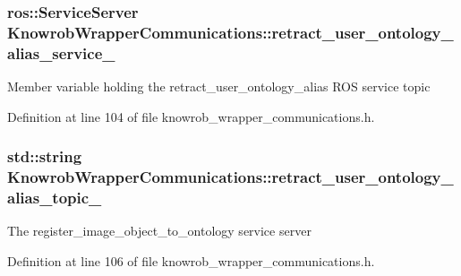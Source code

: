 \hypertarget{classKnowrobWrapperCommunications_a281262d96049a59096a5a29fbaac77d2}{
\subsubsection[{retract\-\_\-user\-\_\-ontology\-\_\-alias\-\_\-service\-\_\-}]{\setlength{\rightskip}{0pt plus 5cm}ros\-::\-Service\-Server Knowrob\-Wrapper\-Communications\-::retract\-\_\-user\-\_\-ontology\-\_\-alias\-\_\-service\-\_\-\hspace{0.3cm}{\ttfamily [private]}}}\label{classKnowrobWrapperCommunications_a281262d96049a59096a5a29fbaac77d2}
Member variable holding the retract\-\_\-user\-\_\-ontology\-\_\-alias R\-O\-S service topic 

Definition at line 104 of file knowrob\-\_\-wrapper\-\_\-communications.\-h.

\hypertarget{classKnowrobWrapperCommunications_afde9fb500053dd1ac1605af6728f03f0}{
\subsubsection[{retract\-\_\-user\-\_\-ontology\-\_\-alias\-\_\-topic\-\_\-}]{\setlength{\rightskip}{0pt plus 5cm}std\-::string Knowrob\-Wrapper\-Communications\-::retract\-\_\-user\-\_\-ontology\-\_\-alias\-\_\-topic\-\_\-\hspace{0.3cm}{\ttfamily [private]}}}\label{classKnowrobWrapperCommunications_afde9fb500053dd1ac1605af6728f03f0}
The register\-\_\-image\-\_\-object\-\_\-to\-\_\-ontology service server 

Definition at line 106 of file knowrob\-\_\-wrapper\-\_\-communications.\-h.

